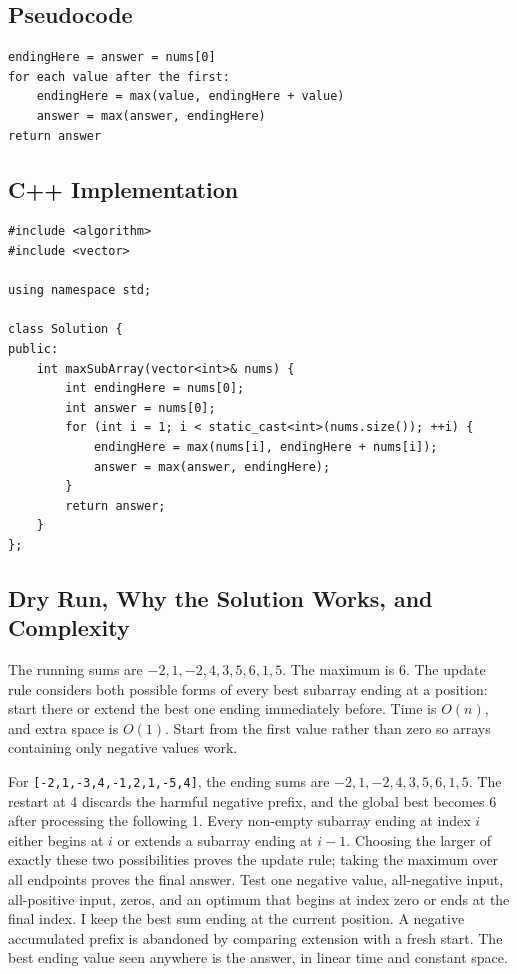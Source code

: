 \subsection{Pseudocode}
\begin{lstlisting}[style=pseudocode]
endingHere = answer = nums[0]
for each value after the first:
    endingHere = max(value, endingHere + value)
    answer = max(answer, endingHere)
return answer
\end{lstlisting}

\subsection{C++ Implementation}
\begin{lstlisting}[style=compactcode,caption={Complete C++ solution: Maximum Subarray}]
#include <algorithm>
#include <vector>

using namespace std;

class Solution {
public:
    int maxSubArray(vector<int>& nums) {
        int endingHere = nums[0];
        int answer = nums[0];
        for (int i = 1; i < static_cast<int>(nums.size()); ++i) {
            endingHere = max(nums[i], endingHere + nums[i]);
            answer = max(answer, endingHere);
        }
        return answer;
    }
};
\end{lstlisting}

\subsection{Dry Run, Why the Solution Works, and Complexity}
The running sums are \(-2,1,-2,4,3,5,6,1,5\). The maximum is \(6\).
The update rule considers both possible forms of every best subarray ending
at a position: start there or extend the best one ending immediately before.
Time is \(O(n)\), and extra space is \(O(1)\). Start from the first
value rather than zero so arrays containing only negative values work.

\lessonexpansion
  {For \texttt{[-2,1,-3,4,-1,2,1,-5,4]}, the ending sums are
   \(-2,1,-2,4,3,5,6,1,5\). The restart at 4 discards the harmful negative
   prefix, and the global best becomes 6 after processing the following 1.}
  {Every non-empty subarray ending at index \(i\) either begins at \(i\) or
   extends a subarray ending at \(i-1\). Choosing the larger of exactly these
   two possibilities proves the update rule; taking the maximum over all
   endpoints proves the final answer.}
  {Test one negative value, all-negative input, all-positive input, zeros,
   and an optimum that begins at index zero or ends at the final index.}
  {I keep the best sum ending at the current position. A negative accumulated
   prefix is abandoned by comparing extension with a fresh start. The best
   ending value seen anywhere is the answer, in linear time and constant space.}

